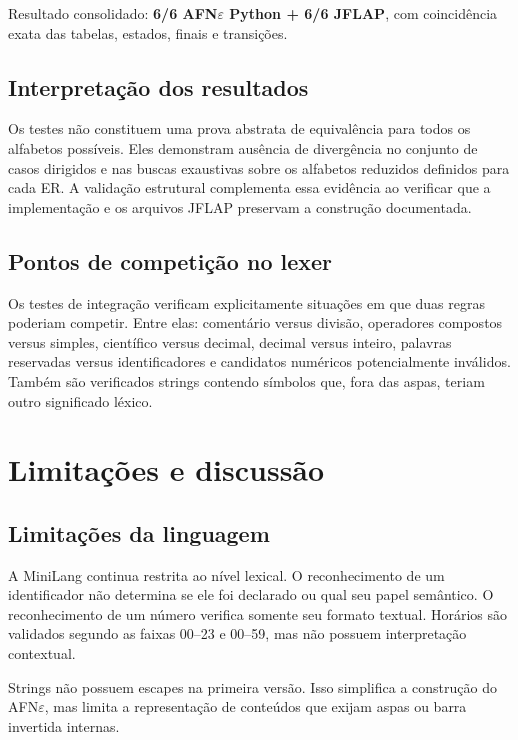 \documentclass[12pt,a4paper,oneside]{report}
\begin{document}
Resultado consolidado: \textbf{6/6 AFN$\varepsilon$ Python + 6/6 JFLAP}, com coincidência exata das tabelas, estados, finais e transições.

\section{Interpretação dos resultados}

Os testes não constituem uma prova abstrata de equivalência para todos os alfabetos possíveis. Eles demonstram ausência de divergência no conjunto de casos dirigidos e nas buscas exaustivas sobre os alfabetos reduzidos definidos para cada ER. A validação estrutural complementa essa evidência ao verificar que a implementação e os arquivos JFLAP preservam a construção documentada.

\section{Pontos de competição no lexer}

Os testes de integração verificam explicitamente situações em que duas regras poderiam competir. Entre elas: comentário versus divisão, operadores compostos versus simples, científico versus decimal, decimal versus inteiro, palavras reservadas versus identificadores e candidatos numéricos potencialmente inválidos. Também são verificados strings contendo símbolos que, fora das aspas, teriam outro significado léxico.



\chapter{Limitações e discussão}

\section{Limitações da linguagem}

A MiniLang continua restrita ao nível lexical. O reconhecimento de um identificador não determina se ele foi declarado ou qual seu papel semântico. O reconhecimento de um número verifica somente seu formato textual. Horários são validados segundo as faixas 00--23 e 00--59, mas não possuem interpretação contextual.

Strings não possuem escapes na primeira versão. Isso simplifica a construção do AFN$\varepsilon$, mas limita a representação de conteúdos que exijam aspas ou barra invertida internas.
\end{document}
